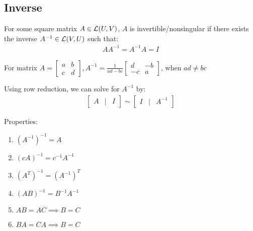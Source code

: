 \documentclass[12pt, a4paper]{article}
\begin{document}
\begin{multicols*}{3}
\colbreak

\subsection{Inverse}
For some square matrix $A \in \mathcal{L}(U, V)$, $A$ is invertible/nonsingular if there exists the inverse $A^{-1} \in \mathcal{L}(V, U)$ such that:
\begin{align*}
  AA^{-1} = A^{-1}A = I
\end{align*}

For matrix $A = \begin{bmatrix} a & b \\ c & d\end{bmatrix}, A^{-1} = \frac{1}{ad-bc}\begin{bmatrix} d & -b \\ -c & a\end{bmatrix}$, when $ad \neq bc$

Using row reduction, we can solve for $A^{-1}$ by:
\begin{align*}
  \begin{bmatrix}A & | & I\end{bmatrix} \sim \begin{bmatrix}I & | & A^{-1}\end{bmatrix}
\end{align*}

Properties:
\begin{enumerate}[\roman*.]
  \item $(A^{-1})^{-1} = A$
  \item $(cA)^{-1} = c^{-1}A^{-1}$
  \item $(A^T)^{-1} = (A^{-1})^T$
  \item $(AB)^{-1} = B^{-1}A^{-1}$
  \item $AB = AC \implies B = C$
  \item $BA = CA \implies B = C$
\end{enumerate}


\end{multicols*}
\end{document}
